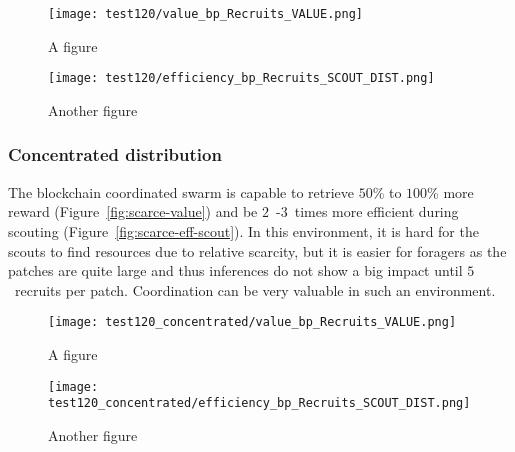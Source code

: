 \documentclass[runningheads]{llncs}
\begin{document}
\begin{figure}
\centering
\begin{minipage}{.495\textwidth}
  \centering
  \texttt{[image: test120/value\_bp\_Recruits\_VALUE.png]}
  \caption{A figure}
  \label{fig:scattered-value}
\end{minipage}
\centering
\begin{minipage}{.495\textwidth}
  \centering
  \texttt{[image: test120/efficiency\_bp\_Recruits\_SCOUT\_DIST.png]}
  \caption{Another figure}
  \label{fig:scattered-eff-exp}
\end{minipage}
\end{figure}



\subsubsection{Concentrated distribution}

The blockchain coordinated swarm is capable to retrieve $50$\% to $100$\% more reward (Figure~\ref{fig:scarce-value}) and be $2$~-$3$~times more efficient during scouting (Figure~\ref{fig:scarce-eff-scout}). In this environment, it is hard for the scouts to find resources due to relative scarcity, but it is easier for foragers as the patches are quite large and thus inferences do not show a big impact until $5$~recruits per patch. Coordination can be very valuable in such an environment.

\begin{figure}
\centering
\begin{minipage}{.495\textwidth}
  \centering
  \texttt{[image: test120\_concentrated/value\_bp\_Recruits\_VALUE.png]}
  \caption{A figure}
  \label{fig:concentrated-value}
\end{minipage}
\begin{minipage}{.495\textwidth}
  \centering
  \texttt{[image: test120\_concentrated/efficiency\_bp\_Recruits\_SCOUT\_DIST.png]}
  \caption{Another figure}
  \label{fig:concentrated-eff-scout}
\end{minipage}
\end{figure}
\end{document}
